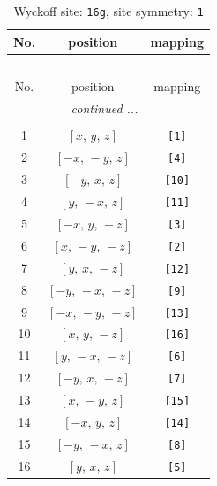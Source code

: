\documentclass[fleqn,8pt]{jsarticle}
\begin{document}
\renewcommand{\arraystretch}{1.2}
\begin{longtable}{ccc}
\caption{Wyckoff site: {\tt 16g}, site symmetry: {\tt 1}}
 \\
 \hline \hline
No. & position & mapping \\ \hline \endfirsthead

\multicolumn{2}{l}{\tablename\ \thetable{}} \\
 \hline \hline
No. & position & mapping \\ \hline \endhead

 \hline \hline
\multicolumn{2}{r}{\footnotesize\it continued ...} \\ \endfoot

 \hline \hline
\multicolumn{2}{r}{} \\ \endlastfoot

1 & $\left[ x,\, y,\, z \right]$ & {\tt [1]} \\ \hline
2 & $\left[ - x,\, - y,\, z \right]$ & {\tt [4]} \\ \hline
3 & $\left[ - y,\, x,\, z \right]$ & {\tt [10]} \\ \hline
4 & $\left[ y,\, - x,\, z \right]$ & {\tt [11]} \\ \hline
5 & $\left[ - x,\, y,\, - z \right]$ & {\tt [3]} \\ \hline
6 & $\left[ x,\, - y,\, - z \right]$ & {\tt [2]} \\ \hline
7 & $\left[ y,\, x,\, - z \right]$ & {\tt [12]} \\ \hline
8 & $\left[ - y,\, - x,\, - z \right]$ & {\tt [9]} \\ \hline
9 & $\left[ - x,\, - y,\, - z \right]$ & {\tt [13]} \\ \hline
10 & $\left[ x,\, y,\, - z \right]$ & {\tt [16]} \\ \hline
11 & $\left[ y,\, - x,\, - z \right]$ & {\tt [6]} \\ \hline
12 & $\left[ - y,\, x,\, - z \right]$ & {\tt [7]} \\ \hline
13 & $\left[ x,\, - y,\, z \right]$ & {\tt [15]} \\ \hline
14 & $\left[ - x,\, y,\, z \right]$ & {\tt [14]} \\ \hline
15 & $\left[ - y,\, - x,\, z \right]$ & {\tt [8]} \\ \hline
16 & $\left[ y,\, x,\, z \right]$ & {\tt [5]} \\
\end{longtable}
\end{document}

